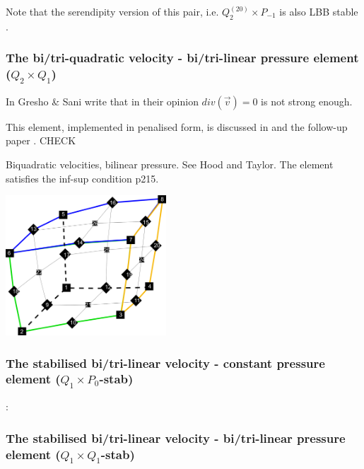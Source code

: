 Note that the serendipity version of this pair, i.e. $Q_2^{(20)}\times P_{-1}$ is also LBB stable
\cite[p180]{reddybook2}.


\subsubsection{The bi/tri-quadratic velocity - bi/tri-linear pressure element ($Q_2 \times Q_1$)}

\begin{minipage}[t]{0.5\textwidth}

\end{minipage}
\begin{minipage}[t]{0.5\textwidth}

\end{minipage}


In \cite{grsa} Gresho \& Sani write that in their opinion $div(\vec v)=0$ is not strong enough.

This element, implemented in penalised form, is discussed in \cite{been79} and the follow-up paper \cite{been80}. CHECK

Biquadratic velocities, bilinear pressure. See Hood and Taylor. The element satisfies the inf-sup condition \cite{hugh}p215. 

\begin{center}
\includegraphics[width=6cm]{images/q2q1/q2numering}
\end{center}

\subsubsection{The stabilised bi/tri-linear velocity -  constant pressure element ($Q_1\times P_0$-stab)}

\Literature: \cite{lisi12}

\subsubsection{The stabilised bi/tri-linear velocity -  bi/tri-linear pressure element ($Q_1\times Q_1$-stab)}

